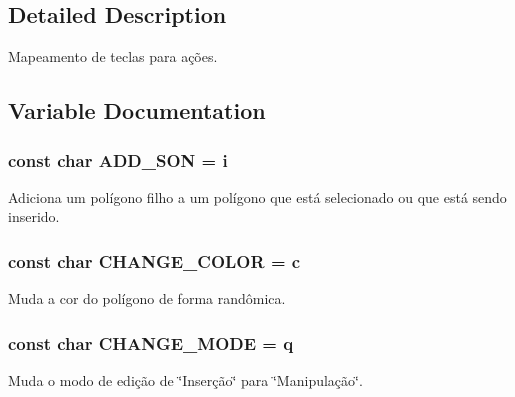 \subsection{Detailed Description}
Mapeamento de teclas para ações. 

\subsection{Variable Documentation}
\hypertarget{group___keyboard_map_gaf403811a703b2056718fb8d044d13c1d}{}
\subsubsection[{A\+D\+D\+\_\+\+S\+O\+N}]{\setlength{\rightskip}{0pt plus 5cm}const char A\+D\+D\+\_\+\+S\+O\+N = \textquotesingle{}i\textquotesingle{}}\label{group___keyboard_map_gaf403811a703b2056718fb8d044d13c1d}
Adiciona um polígono filho a um polígono que está selecionado ou que está sendo inserido. \hypertarget{group___keyboard_map_ga87084941f950b48e78d2988a0d9c6506}{}
\subsubsection[{C\+H\+A\+N\+G\+E\+\_\+\+C\+O\+L\+O\+R}]{\setlength{\rightskip}{0pt plus 5cm}const char C\+H\+A\+N\+G\+E\+\_\+\+C\+O\+L\+O\+R = \textquotesingle{}c\textquotesingle{}}\label{group___keyboard_map_ga87084941f950b48e78d2988a0d9c6506}
Muda a cor do polígono de forma randômica. \hypertarget{group___keyboard_map_ga19e19571f1f477319c5b65d823f8067e}{}
\subsubsection[{C\+H\+A\+N\+G\+E\+\_\+\+M\+O\+D\+E}]{\setlength{\rightskip}{0pt plus 5cm}const char C\+H\+A\+N\+G\+E\+\_\+\+M\+O\+D\+E = \textquotesingle{}q\textquotesingle{}}\label{group___keyboard_map_ga19e19571f1f477319c5b65d823f8067e}
Muda o modo de edição de \char`\"{}\+Inserção\char`\"{} para \char`\"{}\+Manipulação\char`\"{}. \hypertarget{group___keyboard_map_ga6117f2740efee651caa6f96887bd3ae5}{}
